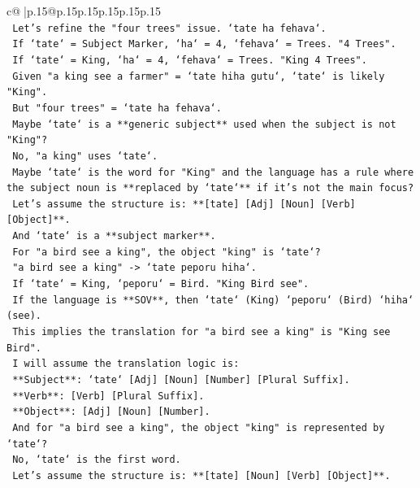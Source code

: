 \documentclass{article}
\begin{document}
{\begin{supertabular}{c@{$\;$}|p{.15\linewidth}@{}p{.15\linewidth}p{.15\linewidth}p{.15\linewidth}p{.15\linewidth}p{.15\linewidth}}
{{{\\ 
\texttt{    Let's refine the "four trees" issue. `tate ha fehava`.} \\
\texttt{    If `tate` = Subject Marker, `ha` = 4, `fehava` = Trees. "4 Trees".} \\
\texttt{    If `tate` = King, `ha` = 4, `fehava` = Trees. "King 4 Trees".} \\
\texttt{    Given "a king see a farmer" = `tate hiha gutu`, `tate` is likely "King".} \\
\texttt{    But "four trees" = `tate ha fehava`.} \\
\texttt{    Maybe `tate` is a **generic subject** used when the subject is not "King"?} \\
\texttt{    No, "a king" uses `tate`.} \\
\texttt{    Maybe `tate` is the word for "King" and the language has a rule where the subject noun is **replaced by `tate`** if it's not the main focus?} \\
\texttt{    Let's assume the structure is: **{[}tate{]} {[}Adj{]} {[}Noun{]} {[}Verb{]} {[}Object{]}**.} \\
\texttt{    And `tate` is a **subject marker**.} \\
\texttt{    For "a bird see a king", the object "king" is `tate`?} \\
\texttt{    "a bird see a king" {-}> `tate peporu hiha`.} \\
\texttt{    If `tate` = King, `peporu` = Bird. "King Bird see".} \\
\texttt{    If the language is **SOV**, then `tate` (King) `peporu` (Bird) `hiha` (see).} \\
\texttt{    This implies the translation for "a bird see a king" is "King see Bird".} \\
\texttt{    I will assume the translation logic is:} \\
\texttt{    **Subject**: `tate` {[}Adj{]} {[}Noun{]} {[}Number{]} {[}Plural Suffix{]}.} \\
\texttt{    **Verb**: {[}Verb{]} {[}Plural Suffix{]}.} \\
\texttt{    **Object**: {[}Adj{]} {[}Noun{]} {[}Number{]}.} \\
\texttt{    And for "a bird see a king", the object "king" is represented by `tate`?} \\
\texttt{    No, `tate` is the first word.} \\
\texttt{    Let's assume the structure is: **{[}tate{]} {[}Noun{]} {[}Verb{]} {[}Object{]}**.} \\
}}}
\end{supertabular}}
\end{document}
